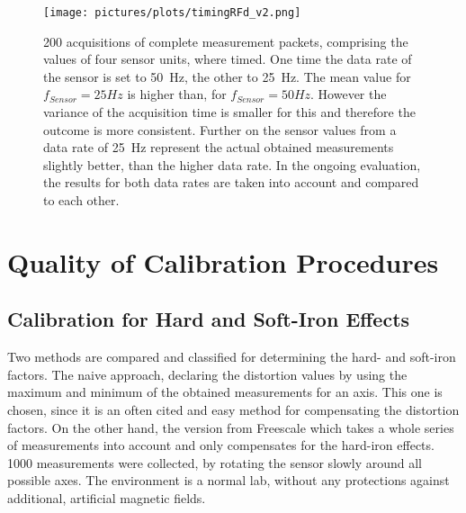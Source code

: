 \begin{figure}[!htb]
\centering
\texttt{[image: pictures/plots/timingRFd\_v2.png]}
\caption{200 acquisitions of complete measurement packets, comprising the values of four sensor units, where timed. One time the data rate of the sensor is set to \SI{50}{\Hz}, the other to \SI{25}{\Hz}. The mean value for $ f_{Sensor}=25\si{Hz} $ is higher than, for $ f_{Sensor}=50\si{Hz} $. However the variance of the acquisition time is smaller for this and therefore the outcome is more consistent. Further on the sensor values from a data rate of \SI{25}{\Hz} represent the actual obtained measurements slightly better, than the higher data rate. In the ongoing evaluation, the results for both data rates are taken into account and compared to each other. }
\label{fig:sensTime}
\end{figure}


\section{Quality of Calibration Procedures} \label{sec:cali}

\subsection{Calibration for Hard and Soft-Iron Effects}\label{subsec:resHardSoft}

Two methods are compared and classified for determining the hard- and soft-iron factors. The naive approach, declaring the distortion values by using the maximum and minimum of the obtained measurements for an axis. This one is chosen, since it is an often cited and easy method for compensating the distortion factors. On the other hand, the version from Freescale \cite{ozyagcilar2012calibrating} which takes a whole series of measurements into account and only compensates for the hard-iron effects. 1000 measurements were collected, by rotating the sensor slowly around all possible axes. The environment is a normal lab, without any protections against additional, artificial magnetic fields. 

